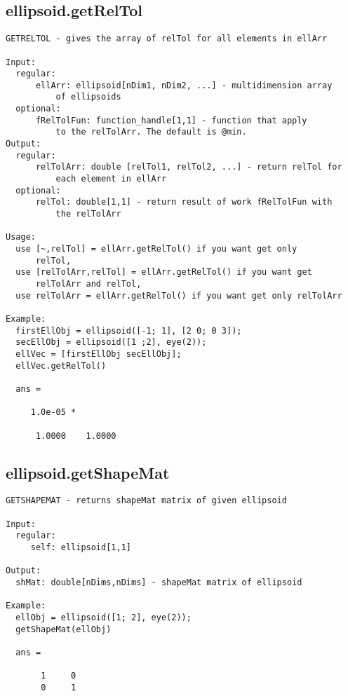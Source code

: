 \subsection{\texorpdfstring{ellipsoid.getRelTol}{getRelTol}}\label{method:ellipsoid.getRelTol}
\begin{verbatim}
GETRELTOL - gives the array of relTol for all elements in ellArr

Input:
  regular:
      ellArr: ellipsoid[nDim1, nDim2, ...] - multidimension array
          of ellipsoids
  optional:
      fRelTolFun: function_handle[1,1] - function that apply
          to the relTolArr. The default is @min.
Output:
  regular:
      relTolArr: double [relTol1, relTol2, ...] - return relTol for
          each element in ellArr
  optional:
      relTol: double[1,1] - return result of work fRelTolFun with
          the relTolArr

Usage:
  use [~,relTol] = ellArr.getRelTol() if you want get only
      relTol,
  use [relTolArr,relTol] = ellArr.getRelTol() if you want get
      relTolArr and relTol,
  use relTolArr = ellArr.getRelTol() if you want get only relTolArr

Example:
  firstEllObj = ellipsoid([-1; 1], [2 0; 0 3]);
  secEllObj = ellipsoid([1 ;2], eye(2));
  ellVec = [firstEllObj secEllObj];
  ellVec.getRelTol()

  ans =

     1.0e-05 *

      1.0000    1.0000
\end{verbatim}
\subsection{\texorpdfstring{ellipsoid.getShapeMat}{getShapeMat}}\label{method:ellipsoid.getShapeMat}
\begin{verbatim}
GETSHAPEMAT - returns shapeMat matrix of given ellipsoid

Input:
  regular:
     self: ellipsoid[1,1]

Output:
  shMat: double[nDims,nDims] - shapeMat matrix of ellipsoid

Example:
  ellObj = ellipsoid([1; 2], eye(2));
  getShapeMat(ellObj)

  ans =

       1     0
       0     1
\end{verbatim}
